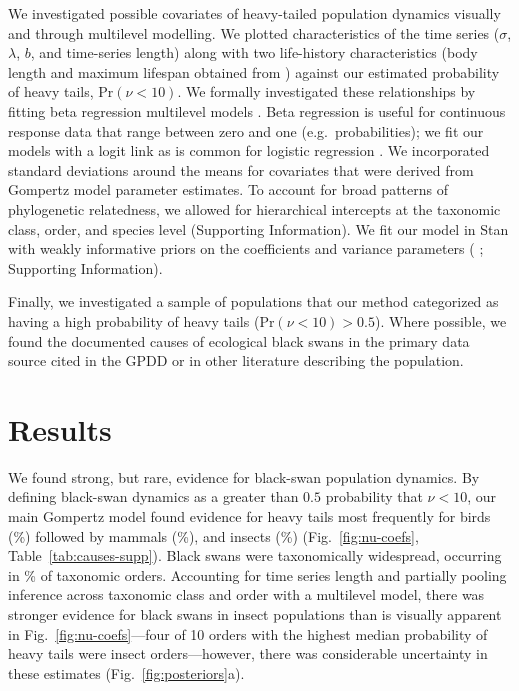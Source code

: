 We investigated possible covariates of heavy-tailed population dynamics
visually and through multilevel modelling. We plotted characteristics of the
time series ($\sigma$, $\lambda$, $b$, and time-series length) along with two
life-history characteristics (body length and maximum lifespan obtained from
\citet{brook2006a}) against our estimated probability of heavy tails, Pr$(\nu <
10)$. We formally investigated these relationships by fitting beta
regression multilevel models \citep{ferrari2004}. Beta regression is useful
for continuous response data that range between zero and one (e.g.\
probabilities); we fit our models with a logit link as is common for logistic
regression \citep{ferrari2004}. We incorporated standard deviations around the
means for covariates that were derived from Gompertz model parameter
estimates. To account for broad patterns of phylogenetic relatedness, we
allowed for hierarchical intercepts at the taxonomic class, order, and species
level (Supporting Information). We fit our model in Stan with weakly
informative priors on the coefficients \citep{gelman2008d} and variance
parameters (\citeauthor{gelman2006c} \citeyear{gelman2006c}
\citeauthor{gelman2014} \citeyear{gelman2014}; Supporting Information).

Finally, we investigated a sample of populations that our method categorized as
having a high probability of heavy tails (Pr$(\nu < 10) > 0.5$). Where
possible, we found the documented causes of ecological black swans in the
primary data source cited in the GPDD or in other literature describing the
population.

\section{Results}

We found strong, but rare, evidence for black-swan population dynamics. By
defining black-swan dynamics as a greater than $0.5$ probability that $\nu <
10$, our main Gompertz model found evidence for heavy tails most frequently
for birds (\birdPH\%) followed by mammals (\mammalsPH\%), and insects
(\insectsPH\%) (Fig.~\ref{fig:nu-coefs}, Table~\ref{tab:causes-supp}). Black
swans were taxonomically widespread, occurring in \POrdersHeavy\% of taxonomic
orders. Accounting for time series length and partially pooling inference
across taxonomic class and order with a multilevel model, there was stronger
evidence for black swans in insect populations than is visually apparent in
Fig.~\ref{fig:nu-coefs}---four of 10 orders with the highest median
probability of heavy tails were insect orders---however, there was
considerable uncertainty in these estimates (Fig.~\ref{fig:posteriors}a).


